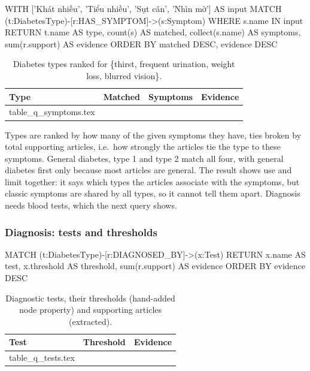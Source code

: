 \documentclass[11pt, a4paper]{article}
\makeatletter
\newcommand{\tabinput}[1]{\@@input #1 }   %
\makeatother
\begin{document}
\begin{codeblock}
WITH ['Khát nhiều', 'Tiểu nhiều', 'Sụt cân', 'Nhìn mờ'] AS input
MATCH (t:DiabetesType)-[r:HAS_SYMPTOM]->(s:Symptom) WHERE s.name IN input
RETURN t.name AS type, count(s) AS matched, collect(s.name) AS symptoms,
       sum(r.support) AS evidence
ORDER BY matched DESC, evidence DESC
\end{codeblock}

\begin{table}[H]
\centering
\small
\caption{Diabetes types ranked for \{thirst, frequent urination, weight loss, blurred vision\}.}
\label{tab:q-symptoms}
\begin{tabularx}{\textwidth}{l r X r}
\toprule
Type & Matched & Symptoms & Evidence \\
\midrule
\tabinput{table_q_symptoms.tex}
\bottomrule
\end{tabularx}
\end{table}

Types are ranked by how many of the given symptoms they have, ties broken by total supporting articles, i.e.\ how strongly the articles tie the type to these symptoms. General diabetes, type 1 and type 2 match all four, with general diabetes first only because most articles are general. The result shows use and limit together: it says which types the articles associate with the symptoms, but classic symptoms are shared by all types, so it cannot tell them apart. Diagnosis needs blood tests, which the next query shows.

\subsubsection{Diagnosis: tests and thresholds}

\begin{codeblock}
MATCH (t:DiabetesType)-[r:DIAGNOSED_BY]->(x:Test)
RETURN x.name AS test, x.threshold AS threshold, sum(r.support) AS evidence
ORDER BY evidence DESC
\end{codeblock}

\begin{table}[H]
\centering
\small
\caption{Diagnostic tests, their thresholds (hand-added node property) and supporting articles (extracted).}
\label{tab:q-tests}
\begin{tabularx}{\textwidth}{l X r}
\toprule
Test & Threshold & Evidence \\
\midrule
\tabinput{table_q_tests.tex}
\bottomrule
\end{tabularx}
\end{table}
\end{document}
